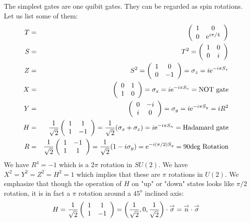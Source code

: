 \documentclass[onecolumn,fleqn, 11pt]{revtex4}
\newcommand{\eexp}{\mathrm{e}^}
\newcommand{\beq}{\begin{eqnarray}}
\newcommand{\eeq}{\end{eqnarray}}
\begin{document}
The simplest gates are one quibit gates.
They can be regarded as spin rotations. 
Let us list some of them:
\beq
T &=& \left(
\begin{array}
[c]{cc}1 & 0\\
0 & \eexp{i\pi/4}\end{array}
\right)  
\\ \nonumber
S &=& T^{2}=\left(
\begin{array}
[c]{cc}1 & 0\\
0 & i
\end{array}
\right)  
\\ \nonumber
Z &=& S^{2}=\left(
\begin{array}
[c]{cc}
1 & 0\\
0 & -1
\end{array}
\right) =  \sigma_{z} = i\eexp{-i\pi S_{z}}
\\ \nonumber
X &=& \left(
\begin{array}
[c]{cc} 
0 & 1\\
1 & 0
\end{array}
\right)  = \sigma_{x} = i\eexp{-i\pi S_{x}} = \mbox{NOT gate}
\\ \nonumber
Y &=& \left(
\begin{array}
[c]{cc}0 & -i\\
i & 0
\end{array}
\right)  = \sigma_{y} =  i\eexp{-i\pi S_{y}} = iR^2
\\ \nonumber
H &=& 
\frac{1}{\sqrt{2}}
\left(
\begin{array}
[c]{cc}1 & 1\\
1 & -1
\end{array} 
\right) 
= \frac{1}{\sqrt{2}}(\sigma_x+\sigma_z)
= i\eexp{-i\pi S_{n}} 
= \mbox{Hadamard gate}
\\ \nonumber
R &=& 
\frac{1}{\sqrt{2}}
\left(
\begin{array}
[c]{cc}1 & -1\\
1 & 1
\end{array} 
\right) 
= \frac{1}{\sqrt{2}}(1-i\sigma_y)
= \eexp{-i(\pi/2) S_{y}} 
= \mbox{90deg Rotation}
\eeq
We have $R^4=-1$ which is a $2\pi$ rotation in $SU(2)$.
We have $X^{2}=Y^{2}=Z^{2}=H^{2}=1$ which implies 
that these are $\pi$ rotations in $U(2)$.  
We emphasize that though the operation of $H$ on "up" 
or "down" states looks like $\pi/2$ rotation, 
it is in fact a $\pi$ rotation around a $45^o$ inclined axis:   
\beq
H =
\frac{1}{\sqrt{2}}\left(
\begin{array}
[c]{cc}1 & 1\\
1 & -1
\end{array}
\right)  =\left(  \frac{1}{\sqrt{2}},0,\frac{1}{\sqrt{2}}\right)
\cdot\overset{\rightarrow}{\sigma}=\overset{\rightarrow}{n}\cdot
\overset{\rightarrow}{\sigma}
\eeq
\end{document}
